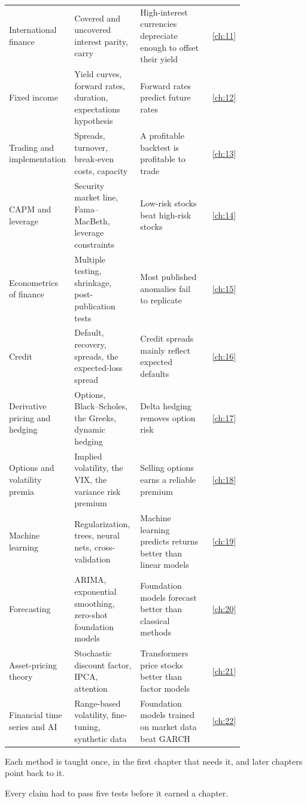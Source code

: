 \begin{longtable}{@{}>{\raggedright\arraybackslash}p{0.198\linewidth}>{\raggedright\arraybackslash}p{0.288\linewidth}>{\raggedright\arraybackslash}p{0.297\linewidth}r@{}}
International finance & Covered and uncovered interest parity, carry & High-interest currencies depreciate enough to offset their yield & \ref{ch:11} \\
Fixed income & Yield curves, forward rates, duration, expectations hypothesis & Forward rates predict future rates & \ref{ch:12} \\
Trading and implementation & Spreads, turnover, break-even costs, capacity & A profitable backtest is profitable to trade & \ref{ch:13} \\
CAPM and leverage & Security market line, Fama--MacBeth, leverage constraints & Low-risk stocks beat high-risk stocks & \ref{ch:14} \\
Econometrics of finance & Multiple testing, shrinkage, post-publication tests & Most published anomalies fail to replicate & \ref{ch:15} \\
Credit & Default, recovery, spreads, the expected-loss spread & Credit spreads mainly reflect expected defaults & \ref{ch:16} \\
Derivative pricing and hedging & Options, Black--Scholes, the Greeks, dynamic hedging & Delta hedging removes option risk & \ref{ch:17} \\
Options and volatility premia & Implied volatility, the VIX, the variance risk premium & Selling options earns a reliable premium & \ref{ch:18} \\
Machine learning & Regularization, trees, neural nets, cross-validation & Machine learning predicts returns better than linear models & \ref{ch:19} \\
Forecasting & ARIMA, exponential smoothing, zero-shot foundation models & Foundation models forecast better than classical methods & \ref{ch:20} \\
Asset-pricing theory & Stochastic discount factor, IPCA, attention & Transformers price stocks better than factor models & \ref{ch:21} \\
Financial time series and AI & Range-based volatility, fine-tuning, synthetic data & Foundation models trained on market data beat GARCH & \ref{ch:22} \\
\end{longtable}
\endgroup

Each method is taught once, in the first chapter that needs it, and later chapters point back to it.

Every claim had to pass five tests before it earned a chapter.


